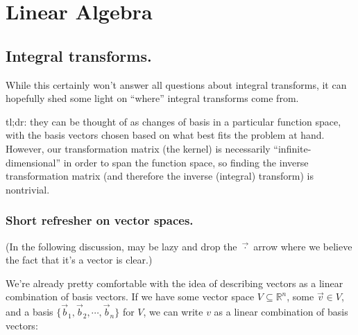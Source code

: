\documentclass[letterpaper,12pt]{report}
\begin{document}
\newpage


\chapter{Linear Algebra}\label{linear-algebra}


\section{Integral transforms.}

While this certainly won't answer all questions about integral transforms, it can hopefully
shed some light on ``where'' integral transforms come from.\par
tl;dr: they can be thought of as changes of basis in a particular function space,
with the basis vectors chosen based on what best fits the problem at hand.
However, our transformation matrix (the kernel) is necessarily ``infinite-dimensional''
in order to span the function space, so finding the inverse transformation matrix
(and therefore the inverse (integral) transform) is nontrivial.

\subsection{Short refresher on vector spaces.}

(In the following discussion,
may be lazy and drop the \(\vec{\cdot}\) arrow where we believe the fact
that it's a vector is clear.)

We're already pretty comfortable with the idea of describing vectors as a linear combination
of basis vectors. If we have some vector space \(V \subseteq \mathbb{R}^n\),
some \(\vec{v} \in V\),
and
a basis \(\{\vec{b}_1, \vec{b}_2, \cdots, \vec{b}_n\}\) for \(V\), we can write
\(v\) as a linear combination of basis vectors:
\end{document}
